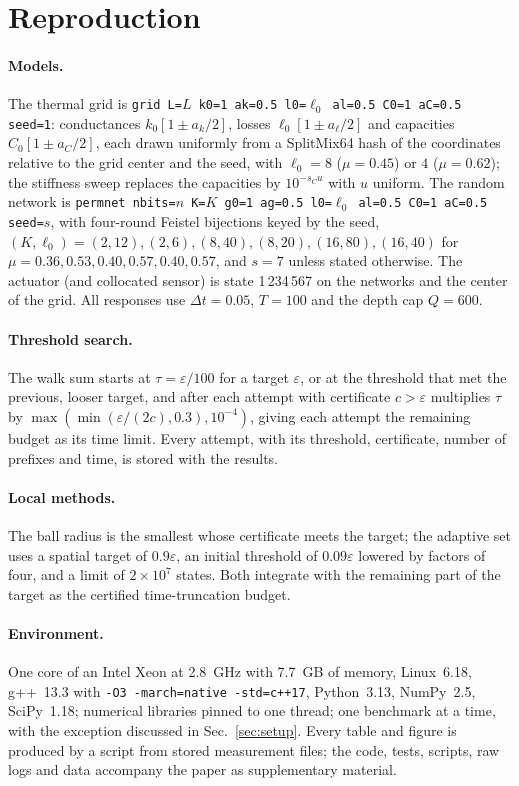 \section{Reproduction}\label{app:repro}

\paragraph*{Models.} The thermal grid is \texttt{grid L=$L$ k0=1 ak=0.5 l0=$\ell_0$ al=0.5 C0=1 aC=0.5 seed=1}: conductances $k_0[1\pm a_k/2]$, losses $\ell_0[1\pm a_\ell/2]$ and capacities $C_0[1\pm a_C/2]$, each drawn uniformly from a SplitMix64 hash of the coordinates relative to the grid center and the seed, with $\ell_0=8$ ($\mu=0.45$) or $4$ ($\mu=0.62$); the stiffness sweep replaces the capacities by $10^{-s_Cu}$ with $u$ uniform. The random network is \texttt{permnet nbits=$n$ K=$K$ g0=1 ag=0.5 l0=$\ell_0$ al=0.5 C0=1 aC=0.5 seed=$s$}, with four-round Feistel bijections keyed by the seed, $(K,\ell_0)=(2,12),(2,6),(8,40),(8,20),(16,80),(16,40)$ for $\mu=0.36,0.53,0.40,0.57,0.40,0.57$, and $s=7$ unless stated otherwise. The actuator (and collocated sensor) is state 1\,234\,567 on the networks and the center of the grid. All responses use $\Delta t=0.05$, $T=100$ and the depth cap $Q=600$.

\paragraph*{Threshold search.} The walk sum starts at $\tau=\varepsilon/100$ for a target $\varepsilon$, or at the threshold that met the previous, looser target, and after each attempt with certificate $c>\varepsilon$ multiplies $\tau$ by $\max(\min(\varepsilon/(2c),0.3),10^{-4})$, giving each attempt the remaining budget as its time limit. Every attempt, with its threshold, certificate, number of prefixes and time, is stored with the results.

\paragraph*{Local methods.} The ball radius is the smallest whose certificate meets the target; the adaptive set uses a spatial target of $0.9\varepsilon$, an initial threshold of $0.09\varepsilon$ lowered by factors of four, and a limit of $2\times10^7$ states. Both integrate with the remaining part of the target as the certified time-truncation budget.

\paragraph*{Environment.} One core of an Intel Xeon at 2.8~GHz with 7.7~GB of memory, Linux~6.18, g++~13.3 with \texttt{-O3 -march=native -std=c++17}, Python~3.13, NumPy~2.5, SciPy~1.18; numerical libraries pinned to one thread; one benchmark at a time, with the exception discussed in Sec.~\ref{sec:setup}. Every table and figure is produced by a script from stored measurement files; the code, tests, scripts, raw logs and data accompany the paper as supplementary material.

